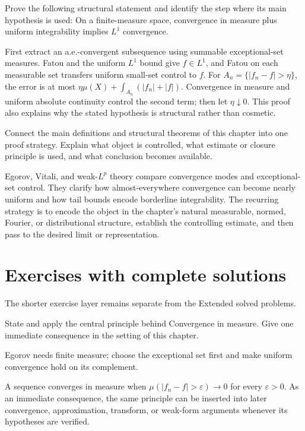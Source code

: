 \begin{problem}\label{prob:iii08-problem-11}
Prove the following structural statement and identify the step where its main hypothesis is used: On a finite-measure space, convergence in measure plus uniform integrability implies $L^1$ convergence.
\end{problem}
\begin{solution}
First extract an a.e.-convergent subsequence using summable exceptional-set measures. Fatou and the uniform $L^1$ bound give $f\in L^1$, and Fatou on each measurable set transfers uniform small-set control to $f$. For $A_n=\{|f_n-f|>\eta\}$, the error is at most $\eta\mu(X)+\int_{A_n}(|f_n|+|f|)$. Convergence in measure and uniform absolute continuity control the second term; then let $\eta\downarrow0$. This proof also explains why the stated hypothesis is structural rather than cosmetic.
\end{solution}

\begin{problem}\label{prob:iii08-problem-12}
Connect the main definitions and structural theorems of this chapter into one proof strategy. Explain what object is controlled, what estimate or closure principle is used, and what conclusion becomes available.
\end{problem}
\begin{solution}
Egorov, Vitali, and weak-$L^p$ theory compare convergence modes and exceptional-set control. They clarify how almost-everywhere convergence can become nearly uniform and how tail bounds encode borderline integrability. The recurring strategy is to encode the object in the chapter's natural measurable, normed, Fourier, or distributional structure, establish the controlling estimate, and then pass to the desired limit or representation.
\end{solution}
\section{Exercises with complete solutions}
The shorter exercise layer remains separate from the Extended solved problems.

\begin{exercise}\label{exr:iii08-01}
State and apply the central principle behind Convergence in measure. Give one immediate consequence in the setting of this chapter.
\end{exercise}
\begin{hint}
Egorov needs finite measure; choose the exceptional set first and make uniform convergence hold on its complement.
\end{hint}
\begin{solution}
A sequence converges in measure when $\mu(|f_n-f|>\varepsilon)\to0$ for every $\varepsilon>0$. As an immediate consequence, the same principle can be inserted into later convergence, approximation, transform, or weak-form arguments whenever its hypotheses are verified.
\end{solution}

